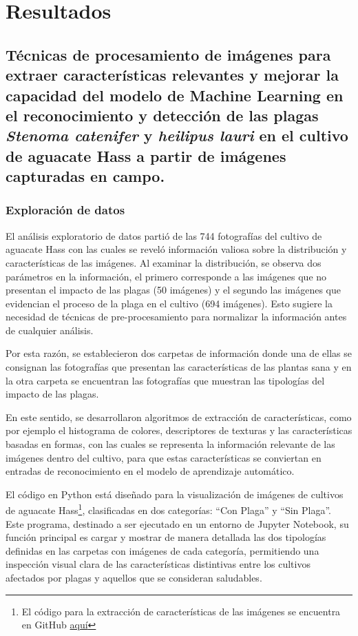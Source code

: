 \section{Resultados}

\subsection{Técnicas de procesamiento de imágenes para extraer características relevantes y mejorar la capacidad del modelo de Machine Learning en el reconocimiento y detección de las plagas \textit{Stenoma catenifer} y \textit{heilipus lauri} en el cultivo de aguacate Hass a partir de imágenes capturadas en campo.}

\subsubsection{Exploración de datos}

El análisis exploratorio de datos partió de las 744 fotografías del cultivo de aguacate Hass con las cuales se reveló información valiosa sobre la distribución y características de las imágenes. Al examinar la distribución, se observa dos parámetros en la información, el primero corresponde a las imágenes que no presentan el impacto de las plagas (50 imágenes) y el segundo las imágenes que evidencian el proceso de la plaga en el cultivo (694 imágenes). Esto sugiere la necesidad de técnicas de pre-procesamiento para normalizar la información antes de cualquier análisis.

Por esta razón, se establecieron dos carpetas de información donde una de ellas se consignan las fotografías que presentan las características de las plantas sana y en la otra carpeta se encuentran las fotografías que muestran las tipologías del impacto de las plagas.

En este sentido, se desarrollaron algoritmos de extracción de características, como por ejemplo el histograma de colores, descriptores de texturas y las características basadas en formas, con las cuales se representa la información relevante de las imágenes dentro del cultivo, para que estas características se conviertan en entradas de reconocimiento en el modelo de aprendizaje automático.

El código en Python está diseñado para la visualización de imágenes de cultivos de aguacate Hass\footnote{El código para la extracción de características de las imágenes se encuentra en GitHub \href{https://github.com/juferoto/mlops_project/blob/master/notebooks/analisisExploratorio.ipynb}{aquí}}, clasificadas en dos categorías: ``Con Plaga'' y ``Sin Plaga''. Este programa, destinado a ser ejecutado en un entorno de Jupyter Notebook, su función principal es cargar y mostrar de manera detallada las dos tipologías definidas en las carpetas con imágenes de cada categoría, permitiendo una inspección visual clara de las características distintivas entre los cultivos afectados por plagas y aquellos que se consideran saludables.

